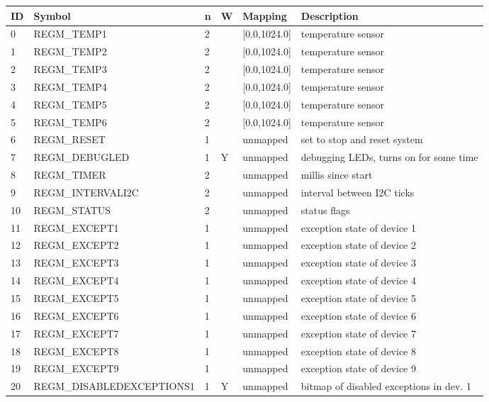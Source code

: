 \begin{tabular}{|p{0.2in}|p{2.3in}|p{0.1in}|p{0.1in}|p{0.7in}|p{2in}|}\hline
\textbf{ID} & \textbf{Symbol} & \textbf{n} & \textbf{W} & \textbf{Mapping} & \textbf{Description}  \\ \hline 
0 & REGM\_TEMP1 & 2 &  & [0.0,1024.0] & temperature sensor\\ \hline
1 & REGM\_TEMP2 & 2 &  & [0.0,1024.0] & temperature sensor\\ \hline
2 & REGM\_TEMP3 & 2 &  & [0.0,1024.0] & temperature sensor\\ \hline
3 & REGM\_TEMP4 & 2 &  & [0.0,1024.0] & temperature sensor\\ \hline
4 & REGM\_TEMP5 & 2 &  & [0.0,1024.0] & temperature sensor\\ \hline
5 & REGM\_TEMP6 & 2 &  & [0.0,1024.0] & temperature sensor\\ \hline
6 & REGM\_RESET & 1 &  & unmapped & set to stop and reset system\\ \hline
7 & REGM\_DEBUGLED & 1 & Y & unmapped & debugging LEDs, turns on for some time\\ \hline
8 & REGM\_TIMER & 2 &  & unmapped & millis since start\\ \hline
9 & REGM\_INTERVALI2C & 2 &  & unmapped & interval between I2C ticks\\ \hline
10 & REGM\_STATUS & 2 &  & unmapped & status flags\\ \hline
11 & REGM\_EXCEPT1 & 1 &  & unmapped & exception state of device 1\\ \hline
12 & REGM\_EXCEPT2 & 1 &  & unmapped & exception state of device 2\\ \hline
13 & REGM\_EXCEPT3 & 1 &  & unmapped & exception state of device 3\\ \hline
14 & REGM\_EXCEPT4 & 1 &  & unmapped & exception state of device 4\\ \hline
15 & REGM\_EXCEPT5 & 1 &  & unmapped & exception state of device 5\\ \hline
16 & REGM\_EXCEPT6 & 1 &  & unmapped & exception state of device 6\\ \hline
17 & REGM\_EXCEPT7 & 1 &  & unmapped & exception state of device 7\\ \hline
18 & REGM\_EXCEPT8 & 1 &  & unmapped & exception state of device 8\\ \hline
19 & REGM\_EXCEPT9 & 1 &  & unmapped & exception state of device 9\\ \hline
20 & REGM\_DISABLEDEXCEPTIONS1 & 1 & Y & unmapped & bitmap of disabled exceptions in dev. 1\\ \hline

\end{tabular}
